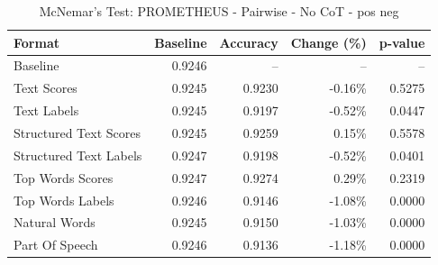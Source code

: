 \begin{table}[htbp]
\centering
\caption{McNemar's Test: PROMETHEUS - Pairwise - No CoT - pos neg}
\label{tab:prometheus-pairwise-no_chain_of_thought-pos_neg}
\begin{tabular}{lrrrr}
\toprule
Format & Baseline & Accuracy & Change (\%) & p-value \\
\midrule
Baseline & 0.9246 & -- & -- & -- \\
Text Scores & 0.9245 & 0.9230 & -0.16\% & 0.5275 \\
Text Labels & 0.9245 & 0.9197 & -0.52\% & 0.0447 \\
Structured Text Scores & 0.9245 & 0.9259 & 0.15\% & 0.5578 \\
Structured Text Labels & 0.9247 & 0.9198 & -0.52\% & 0.0401 \\
Top Words Scores & 0.9247 & 0.9274 & 0.29\% & 0.2319 \\
Top Words Labels & 0.9246 & 0.9146 & -1.08\% & 0.0000 \\
Natural Words & 0.9245 & 0.9150 & -1.03\% & 0.0000 \\
Part Of Speech & 0.9246 & 0.9136 & -1.18\% & 0.0000 \\
\bottomrule
\end{tabular}
\end{table}